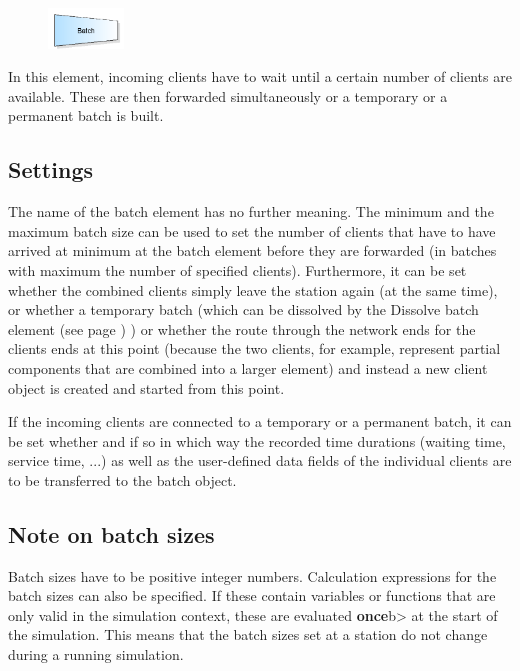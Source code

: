 \begin{figure}
\vspace{-22pt}
\includegraphics[width=2cm]{imageModelElementBatch.png}
\vspace{-22pt}
\end{figure}

In this element, incoming clients have to wait until a certain number of clients are available.
These are then forwarded simultaneously or a temporary or a permanent batch is built.

\subsection*{Settings}

The name of the batch element has no further meaning. The minimum and the maximum batch size can be used
to set the number of clients that have to have arrived at minimum at the batch element before they are
forwarded (in batches with maximum the number of specified clients). Furthermore, it can be set whether
the combined clients simply leave the station again (at the same time), or whether a temporary batch (which
can be dissolved by the Dissolve batch element (see page \pageref{ref:ModelElementSeparate}) ) or whether the route
through the network ends for the clients ends at this point (because the two clients, for example, represent
partial components that are combined into a larger element) and instead a new client object is created and
started from this point.

If the incoming clients are connected to a temporary or a permanent batch, it can be set whether and if so
in which way the recorded time durations (waiting time, service time, ...) as well as the user-defined
data fields of the individual clients are to be transferred to the batch object.

\subsection*{Note on batch sizes}

Batch sizes have to be positive integer numbers.
Calculation expressions for the batch sizes can also be specified.
If these contain variables or functions that are only valid in the simulation context, these are evaluated \textbf{once}b> at the start of the simulation.
This means that the batch sizes set at a station do not change during a running simulation.


